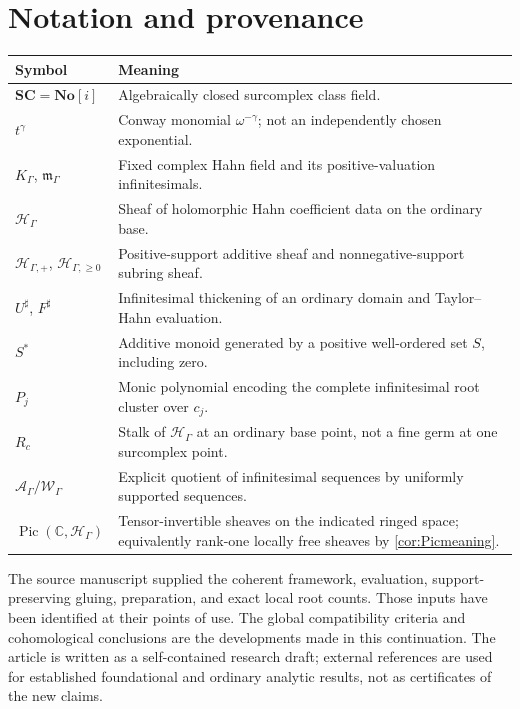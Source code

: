 \documentclass[11pt,letterpaper]{article}
\theoremstyle{definition}
\theoremstyle{remark}
\newcommand{\No}{\mathbf{No}}
\newcommand{\SC}{\mathbf{SC}}
\newcommand{\C}{\mathbb C}
\newcommand{\HH}{\mathscr H_\Gamma}
\newcommand{\HP}{\mathscr H_{\Gamma,+}}
\newcommand{\HI}{\mathscr H_{\Gamma,\ge0}}
\newcommand{\KK}{K_\Gamma}
\newcommand{\mm}{\mathfrak m_\Gamma}
\newcommand{\sh}{^{\sharp}}
\newcommand{\Pic}{\operatorname{Pic}}
\numberwithin{equation}{section}
\begin{document}
\section{Notation and provenance}
\begin{center}\small
\begin{tabular}{@{}L{0.26\textwidth}L{0.63\textwidth}@{}}
\toprule
Symbol & Meaning\\
\midrule
$\SC=\No[i]$ & Algebraically closed surcomplex class field.\\[0.3em]
$t^\gamma$ & Conway monomial $\omega^{-\gamma}$; not an independently chosen exponential.\\[0.3em]
$\KK$, $\mm$ & Fixed complex Hahn field and its positive-valuation infinitesimals.\\[0.3em]
$\HH$ & Sheaf of holomorphic Hahn coefficient data on the ordinary base.\\[0.3em]
$\HP$, $\HI$ & Positive-support additive sheaf and nonnegative-support subring sheaf.\\[0.3em]
$U\sh$, $F\sh$ & Infinitesimal thickening of an ordinary domain and Taylor--Hahn evaluation.\\[0.3em]
$S^*$ & Additive monoid generated by a positive well-ordered set $S$, including zero.\\[0.3em]
$P_j$ & Monic polynomial encoding the complete infinitesimal root cluster over $c_j$.\\[0.3em]
$R_c$ & Stalk of $\HH$ at an ordinary base point, not a fine germ at one surcomplex point.\\[0.3em]
$\mathcal A_\Gamma/\mathcal W_\Gamma$ & Explicit quotient of infinitesimal sequences by uniformly supported sequences.\\[0.3em]
$\Pic(\C,\HH)$ & Tensor-invertible sheaves on the indicated ringed space; equivalently rank-one locally free sheaves by \cref{cor:Picmeaning}.\\
\bottomrule
\end{tabular}
\end{center}

The source manuscript \cite{Source} supplied the coherent framework, evaluation, support-preserving gluing, preparation, and exact local root counts. Those inputs have been identified at their points of use. The global compatibility criteria and cohomological conclusions are the developments made in this continuation. The article is written as a self-contained research draft; external references are used for established foundational and ordinary analytic results, not as certificates of the new claims.
\end{document}
